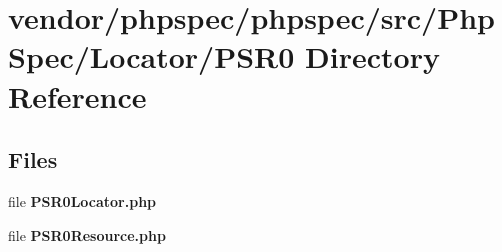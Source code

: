 \section{vendor/phpspec/phpspec/src/\+Php\+Spec/\+Locator/\+P\+S\+R0 Directory Reference}
\label{dir_0a7929fc10da37e135a703d11fdef5ae}
\subsection*{Files}
\begin{DoxyCompactItemize}
\item 
file {\bf P\+S\+R0\+Locator.\+php}
\item 
file {\bf P\+S\+R0\+Resource.\+php}
\end{DoxyCompactItemize}
